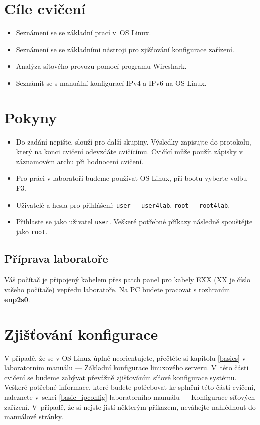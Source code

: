 \section*{Cíle cvičení}
\begin{itemize}
	\item Seznámení se se základní prací v~OS Linux.
	\item Seznámení se se základními nástroji pro zjišťování konfigurace zařízení.
	\item Analýza síťového provozu pomocí programu Wireshark.
	\item Seznámit se s manuální konfigurací IPv4 a IPv6 na OS Linux.
\end{itemize}

\section*{Pokyny}
\begin{itemize}
\item Do zadání nepište, slouží pro další skupiny. Výsledky zapisujte do protokolu, který na konci cvičení odevzdáte cvičícímu. Cvičící může použít zápisky v záznamovém archu při hodnocení cvičení.
\item Pro práci v laboratoři budeme používat OS Linux, při bootu vyberte volbu F3.
\item Uživatelé a hesla pro přihlášení: \texttt{user - user4lab}, \texttt{root - root4lab}.
\item Přihlaste se jako uživatel \texttt{user}. Veškeré potřebné příkazy následně spouštějte jako \texttt{root}.
\end{itemize}

\subsection*{Příprava laboratoře}
Váš počítač je připojený kabelem přes patch panel
pro kabely EXX (XX je číslo vašeho počítače) vepředu laboratoře. Na PC budete
pracovat s rozhraním {\bf enp2s0}.

\section{Zjišťování konfigurace}
V případě, že se v OS Linux úplně neorientujete, přečtěte si kapitolu \ref{basics} v
laboratorním manuálu --- Základní konfigurace linuxového serveru. V~této části cvičení se
budeme zabývat převážně zjišťováním síťové konfigurace systému. Veškeré potřebné
informace, které budete potřebovat ke splnění této části cvičení, naleznete
v~sekci \ref{basic_ipconfig} laboratorního manuálu --- Konfigurace síťových zařízení. V~případě, že si nejste jistí některým příkazem, neváhejte nahlédnout do manuálové stránky.

